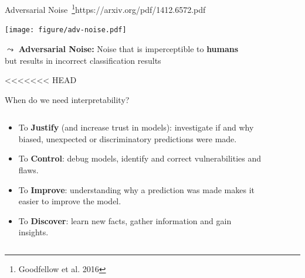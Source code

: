 \documentclass[11pt,compress,t,notes=noshow, xcolor=table]{beamer}
\begin{document}
	
\begin{vbframe}{Adversarial Noise~\footnote{Goodfellow et al. 2016}{https://arxiv.org/pdf/1412.6572.pdf}}
    
    \centering
    \texttt{[image: figure/adv-noise.pdf]}
	
	$\leadsto$ \textbf{Adversarial Noise:} Noise that is imperceptible to \textbf{humans}\\ but results in incorrect classification results
	
\end{vbframe}

<<<<<<< HEAD
\begin{vbframe}{When do we need interpretability?}
\begin{columns}
\begin{column}{0.6\textwidth}
\begin{itemize}
  \item To \textbf{Justify} (and increase trust in models): investigate if and why biased, unexpected or discriminatory predictions were made.
  \item To \textbf{Control}: debug models, identify and correct vulnerabilities and flaws.
  \item To \textbf{Improve}: understanding why a prediction was made makes it easier to improve the model.
  \item To \textbf{Discover}: learn new facts, gather information and gain insights.
\end{itemize}
\end{column}
\begin{column}{0.6\textwidth}  %
 \vspace{0.5cm}
 \begin{center}
 \begin{figure}

\end{figure}
\end{center}
\end{column}
\end{columns}
\end{vbframe}
\end{document}
